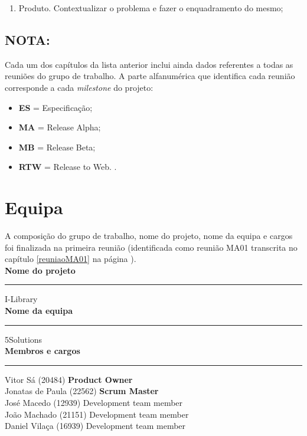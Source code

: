 \begin{enumerate}
	\item Produto. Contextualizar o problema e fazer o enquadramento do mesmo;

\end{enumerate}

\subsection*{\textbf{NOTA}:}

Cada um dos capítulos da lista anterior inclui ainda dados referentes a todas as reuniões do grupo de trabalho. A parte alfanumérica que identifica cada reunião corresponde a cada \textit{milestone} do projeto:
\begin{itemize}
	\item \textbf{ES} = Especificação;
	\item \textbf{MA} = Release Alpha;
	\item \textbf{MB} = Release Beta;
	\item \textbf{RTW} = Release to Web. . 
\end{itemize}

\newpage

\section{Equipa}

A composição do grupo de trabalho, nome do projeto, nome da equipa e cargos foi finalizada na primeira reunião (identificada como reunião MA01 transcrita no capítulo \ref{reuniaoMA01} na página \pageref{reuniaoMA01}).\\[4mm]

\noindent \textbf{Nome do projeto}\\
\noindent \rule{\linewidth}{0.4pt}
\noindent I-Library \\

\noindent \textbf{Nome da equipa}\\
\noindent \rule{\linewidth}{0.4pt}
\noindent 5Solutions \\

\noindent \textbf{Membros e cargos}\\
\noindent \rule{\linewidth}{0.4pt}
\noindent Vitor Sá (20484) \textbf{Product Owner}\\
\noindent Jonatas de Paula  (22562) \textbf{Scrum Master}\\
\noindent José Macedo (12939) Development team member\\
\noindent João Machado (21151) Development team member\\
\noindent Daniel Vilaça (16939) Development team member\\
